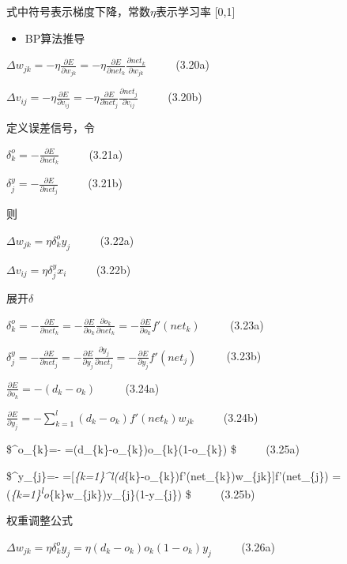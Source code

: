 \documentclass[11pt]{article}
\providecommand{\tightlist}{%
      \setlength{\itemsep}{0pt}\setlength{\parskip}{0pt}}
\begin{document}
式中符号表示梯度下降，常数\(\eta\)表示学习率 {[}0,1{]}

\begin{itemize}
\tightlist
\item
  BP算法推导
\end{itemize}

\(\Delta w_{jk}=-\eta \frac{\partial E}{\partial w_{jk}} =-\eta \frac{\partial E}{\partial net_{k}} \frac{\partial net_{k}}{\partial w_{jk}}\)
\(\qquad\) (3.20a)

\(\Delta v_{ij}=-\eta \frac{\partial E}{\partial v_{ij}} =-\eta \frac{\partial E}{\partial net_{j}} \frac{\partial net_{j}}{\partial v_{ij}}\)
\(\qquad\) (3.20b)

定义误差信号，令

\(\delta ^o_{k}=-\frac{\partial E}{\partial net_{k}}\) \(\qquad\)
(3.21a)

\(\delta ^y_{j}=-\frac{\partial E}{\partial net_{j}}\) \(\qquad\)
(3.21b)

则

\(\Delta w_{jk}=\eta \delta^o_{k} y_{j}\) \(\qquad\) (3.22a)

\(\Delta v_{ij}=\eta \delta^y_{j} x_{i}\) \(\qquad\) (3.22b)

展开\(\delta\)

\(\delta ^o_{k}=-\frac{\partial E}{\partial net_{k}} =-\frac{\partial E}{\partial o_{k}} \frac{\partial o_{k}}{\partial net_{k}} =-\frac{\partial E}{\partial o_{k}} f'(net_{k})\)
\(\qquad\) (3.23a)

\(\delta ^y_{j}=-\frac{\partial E}{\partial net_{j}} =-\frac{\partial E}{\partial y_{j}} \frac{\partial y_{j}}{\partial net_{j}} =-\frac{\partial E}{\partial y_{j}} f'(net_{j})\)
\(\qquad\) (3.23b)

\(\frac{\partial E}{\partial o_{k}}=-(d_{k}-o_{k})\) \(\qquad\) (3.24a)

\(\frac{\partial E}{\partial y_{j}} =-\sum_{k=1}^l(d_{k}-o_{k})f'(net_{k})w_{jk}\)
\(\qquad\) (3.24b)

\$\delta \^{}o\_\{k\}=-
=(d\_\{k\}-o\_\{k\})o\_\{k\}(1-o\_\{k\}) \$ \(\qquad\) (3.25a)

\$\delta \^{}y\_\{j\}=-
={[}\sum\emph{\{k=1\}\^{}l(d}\{k\}-o\_\{k\})f'(net\_\{k\})w\_\{jk\}{]}f'(net\_\{j\})
=(\sum\emph{\{k=1\}\textsuperscript{l\delta }o}\{k\}w\_\{jk\})y\_\{j\}(1-y\_\{j\})
\$ \(\qquad\) (3.25b)

权重调整公式

\(\Delta w_{jk}=\eta \delta^o_{k} y_{j}=\eta (d_{k}-o_{k})o_{k}(1-o_{k}) y_{j}\)
\(\qquad\) (3.26a)
\end{document}
